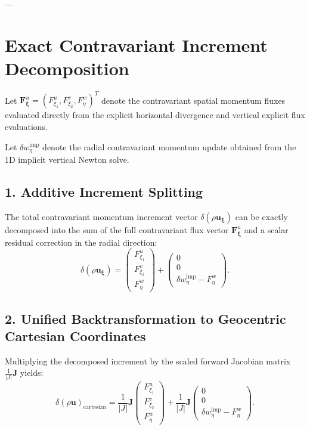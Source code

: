 \documentclass[11pt,a4paper]{article}
\begin{document}
---

\section{Exact Contravariant Increment Decomposition}

Let $\mathbf{F}_{\boldsymbol{\xi}}^u = (F_{\xi_1}^u, F_{\xi_2}^v, F_\eta^w)^T$ denote the contravariant spatial momentum fluxes evaluated directly from the explicit horizontal divergence and vertical explicit flux evaluations.

Let $\delta w_\eta^{\text{imp}}$ denote the radial contravariant momentum update obtained from the 1D implicit vertical Newton solve.

\subsection{1. Additive Increment Splitting}
The total contravariant momentum increment vector $\delta(\rho \boldsymbol{u}_{\boldsymbol{\xi}})$ can be exactly decomposed into the sum of the full contravariant flux vector $\mathbf{F}_{\boldsymbol{\xi}}^u$ and a scalar residual correction in the radial direction:
\begin{equation}
\delta(\rho \boldsymbol{u}_{\boldsymbol{\xi}}) = \begin{pmatrix} F_{\xi_1}^u \\[4pt] F_{\xi_2}^v \\[4pt] F_\eta^w \end{pmatrix} + \begin{pmatrix} 0 \\[4pt] 0 \\[4pt] \delta w_\eta^{\text{imp}} - F_\eta^w \end{pmatrix}.
\end{equation}

\subsection{2. Unified Backtransformation to Geocentric Cartesian Coordinates}
Multiplying the decomposed increment by the scaled forward Jacobian matrix $\frac{1}{|J|} \mathbf{J}$ yields:
\begin{equation}
\delta(\rho \boldsymbol{u})_{\text{cartesian}} = \frac{1}{|J|} \mathbf{J} \begin{pmatrix} F_{\xi_1}^u \\[4pt] F_{\xi_2}^v \\[4pt] F_\eta^w \end{pmatrix} + \frac{1}{|J|} \mathbf{J} \begin{pmatrix} 0 \\[4pt] 0 \\[4pt] \delta w_\eta^{\text{imp}} - F_\eta^w \end{pmatrix}.
\end{equation}
\end{document}
